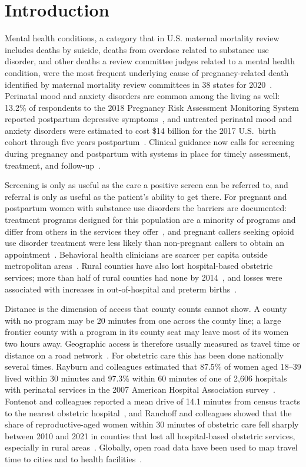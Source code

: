 \documentclass[10pt,twocolumn,letterpaper]{article}
\begin{document}
\section{Introduction}

Mental health conditions, a category that in U.S. maternal mortality review includes deaths by suicide, deaths from overdose related to substance use disorder, and other deaths a review committee judges related to a mental health condition, were the most frequent underlying cause of pregnancy-related death identified by maternal mortality review committees in 38 states for 2020~\cite{cdc_mmrc2020}. Perinatal mood and anxiety disorders are common among the living as well: 13.2\% of respondents to the 2018 Pregnancy Risk Assessment Monitoring System reported postpartum depressive symptoms~\cite{bauman2020}, and untreated perinatal mood and anxiety disorders were estimated to cost \$14 billion for the 2017 U.S.\ birth cohort through five years postpartum~\cite{luca2020}. Clinical guidance now calls for screening during pregnancy and postpartum with systems in place for timely assessment, treatment, and follow-up~\cite{acog_cpg4}.

Screening is only as useful as the care a positive screen can be referred to, and referral is only as useful as the patient's ability to get there. For pregnant and postpartum women with substance use disorders the barriers are documented: treatment programs designed for this population are a minority of programs and differ from others in the services they offer~\cite{meinhofer2020}, and pregnant callers seeking opioid use disorder treatment were less likely than non-pregnant callers to obtain an appointment~\cite{patrick2020}. Behavioral health clinicians are scarcer per capita outside metropolitan areas~\cite{andrilla2018}. Rural counties have also lost hospital-based obstetric services; more than half of rural counties had none by 2014~\cite{hung2017}, and losses were associated with increases in out-of-hospital and preterm births~\cite{kozhimannil2018}.

Distance is the dimension of access that county counts cannot show. A county with no program may be 20 minutes from one across the county line; a large frontier county with a program in its county seat may leave most of its women two hours away. Geographic access is therefore usually measured as travel time or distance on a road network~\cite{luo2003}. For obstetric care this has been done nationally several times. Rayburn and colleagues estimated that 87.5\% of women aged 18--39 lived within 30 minutes and 97.3\% within 60 minutes of one of 2,606 hospitals with perinatal services in the 2007 American Hospital Association survey~\cite{rayburn2012}. Fontenot and colleagues reported a mean drive of 14.1 minutes from census tracts to the nearest obstetric hospital~\cite{fontenot2024}, and Ranchoff and colleagues showed that the share of reproductive-aged women within 30 minutes of obstetric care fell sharply between 2010 and 2021 in counties that lost all hospital-based obstetric services, especially in rural areas~\cite{ranchoff2026}. Globally, open road data have been used to map travel time to cities and to health facilities~\cite{weiss2018,weiss2020}.
\end{document}
